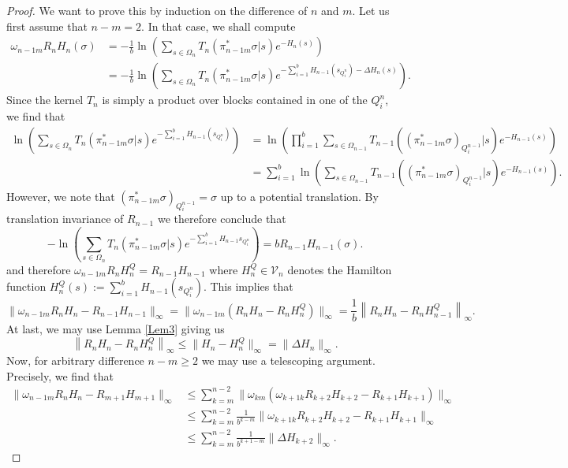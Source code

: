 \documentclass{article}
\begin{document}
\begin{proof}
    We want to prove this by induction on the difference of $n$ and $m$. Let us first assume that $n-m=2$. In that case, we shall compute
    \begin{align}
        \omega_{n-1m}R_nH_n(\sigma)&=-\frac{1}{b}\ln\left(\sum_{s\in\Omega_n}T_n(\pi_{n-1m}^*\sigma|s)e^{-H_n(s)}\right)\nonumber\\
        &=-\frac{1}{b}\ln\left(\sum_{s\in\Omega_n}T_n(\pi_{n-1m}^*\sigma|s)e^{-\sum_{i=1}^bH_{n-1}(s_{Q_i^n})-\Delta H_n(s)}\right).
    \end{align}
    Since the kernel $T_n$ is simply a product over blocks contained in one of the $Q_i^n$, we find that
    \begin{align}
        \ln\left(\sum_{s\in\Omega_n}T_n(\pi_{n-1m}^*\sigma|s)e^{-\sum_{i=1}^bH_{n-1}(s_{Q_i^n})}\right)&=\ln\left(\prod_{i=1}^b\sum_{s\in\Omega_{n-1}}T_{n-1}\left((\pi_{n-1m}^*\sigma)_{Q_i^{n-1}}|s\right)e^{-H_{n-1}(s)}\right)\nonumber\\
        &=\sum_{i=1}^b\ln\left(\sum_{s\in\Omega_{n-1}}T_{n-1}\left((\pi_{n-1m}^*\sigma)_{Q_i^{n-1}}|s\right)e^{-H_{n-1}(s)}\right).
    \end{align}
    However, we note that $(\pi_{n-1m}^*\sigma)_{Q_i^{n-1}}=\sigma$ up to a potential translation. By translation invariance of $R_{n-1}$ we therefore conclude that
    \begin{equation}
        -\ln\left(\sum_{s\in\Omega_n}T_n(\pi_{n-1m}^*\sigma|s)e^{-\sum_{i=1}^bH_{n-1}s_{Q_i^n}}\right)=bR_{n-1}H_{n-1}(\sigma).
    \end{equation}
    and therefore $\omega_{n-1m}R_nH_n^Q=R_{n-1}H_{n-1}$ where $H_{n}^Q\in\mathcal{V}_n$ denotes the Hamilton function $H_{n}^Q(s):=\sum_{i=1}^bH_{n-1}(s_{Q_i^n})$.
    This implies that
    \begin{equation}
        \|\omega_{n-1m}R_nH_n-R_{n-1}H_{n-1}\|_\infty=\|\omega_{n-1m}(R_nH_n-R_nH_n^Q)\|_\infty=\frac{1}{b}\left\|R_nH_n-R_nH_{n-1}^Q\right\|_\infty.
    \end{equation}
    At last, we may use Lemma \ref{Lem3} giving us
    \begin{equation}
        \left\|R_nH_n-R_nH_{n}^Q\right\|_\infty\leq\|H_n-H_{n}^Q\|_\infty=\|\Delta H_n\|_\infty.
    \end{equation}
    Now, for arbitrary difference $n-m\geq2$ we may use a telescoping argument. Precisely, we find that
    \begin{align}
        \|\omega_{n-1m}R_nH_n-R_{m+1}H_{m+1}\|_\infty&\leq\sum_{k=m}^{n-2}\|\omega_{km}(\omega_{k+1k} R_{k+2}H_{k+2}-R_{k+1}H_{k+1})\|_\infty\nonumber\\
        &\leq\sum_{k=m}^{n-2}\frac{1}{b^{k-m}}\|\omega_{k+1k}R_{k+2}H_{k+2}-R_{k+1}H_{k+1}\|_\infty\nonumber\\
        &\leq\sum_{k=m}^{n-2}\frac{1}{b^{k+1-m}}\|\Delta H_{k+2}\|_\infty.
    \end{align}
\end{proof}
\end{document}
